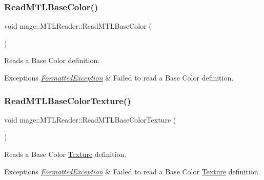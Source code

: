 \subsubsection{\texorpdfstring{Read\+M\+T\+L\+Base\+Color()}{ReadMTLBaseColor()}}
{\footnotesize\ttfamily void mage\+::\+M\+T\+L\+Reader\+::\+Read\+M\+T\+L\+Base\+Color (\begin{DoxyParamCaption}{ }\end{DoxyParamCaption})\hspace{0.3cm}{\ttfamily [private]}}

Reads a Base Color definition.


\begin{DoxyExceptions}{Exceptions}
{\em \hyperlink{classmage_1_1_formatted_exception}{Formatted\+Exception}} & Failed to read a Base Color definition. \\
\hline
\end{DoxyExceptions}
\hypertarget{classmage_1_1_m_t_l_reader_ac91c1785c0a1d72f9c3bb1445e770a06}{}\label{classmage_1_1_m_t_l_reader_ac91c1785c0a1d72f9c3bb1445e770a06} 
\subsubsection{\texorpdfstring{Read\+M\+T\+L\+Base\+Color\+Texture()}{ReadMTLBaseColorTexture()}}
{\footnotesize\ttfamily void mage\+::\+M\+T\+L\+Reader\+::\+Read\+M\+T\+L\+Base\+Color\+Texture (\begin{DoxyParamCaption}{ }\end{DoxyParamCaption})\hspace{0.3cm}{\ttfamily [private]}}

Reads a Base Color \hyperlink{classmage_1_1_texture}{Texture} definition.


\begin{DoxyExceptions}{Exceptions}
{\em \hyperlink{classmage_1_1_formatted_exception}{Formatted\+Exception}} & Failed to read a Base Color \hyperlink{classmage_1_1_texture}{Texture} definition. \\
\hline
\end{DoxyExceptions}
\hypertarget{classmage_1_1_m_t_l_reader_a53494ca5e0f905b97227b21711a1686a}{}\label{classmage_1_1_m_t_l_reader_a53494ca5e0f905b97227b21711a1686a} 
